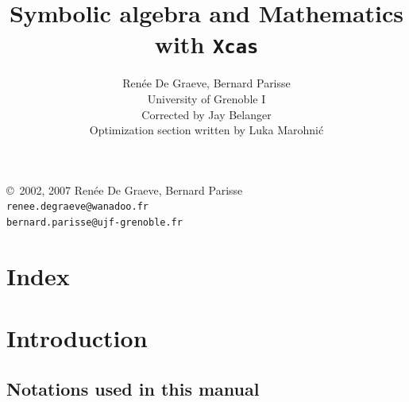 \documentclass[a4paper,11pt]{book}
\title {Symbolic algebra and Mathematics with {\tt Xcas}}
\author{Ren\'ee De Graeve, Bernard Parisse\\ 
University of Grenoble I\\
Corrected by Jay Belanger\\
Optimization section written by Luka Marohnić}
\date{}
\begin{document}
\newcommand{\asinh}{\,\,\mbox{asinh\,}}
\newcommand{\atanh}{\,\,\mbox{atanh\,}}
\maketitle




\vfill


\copyright\ 2002, 2007 Ren\'ee De Graeve, Bernard Parisse\\
\verb|renee.degraeve@wanadoo.fr|\\
\verb|bernard.parisse@ujf-grenoble.fr|\\



\newpage
\tableofcontents

\chapter{Index}
\printindex

\chapter{Introduction}

\section{Notations used in this manual}
\end{document}

